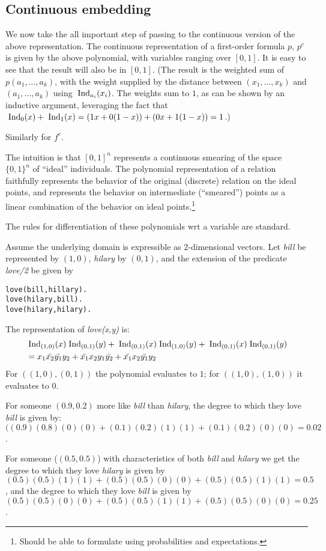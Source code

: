 \documentclass{article} %
\begin{document}
\subsection{Continuous embedding}
We now take the all important step of passing to the continuous version of the above representation. 
The continuous representation of a first-order formula $p$, $p^c$ is given by the above polynomial, with
variables ranging over $[0,1]$. It is easy to see that the result will also be in $[0,1]$. (The result is the weighted sum of $p(a_1, \ldots, 
  a_k)$, with the weight supplied by the distance between $(x_1,
  \ldots, x_k)$ and $(a_1, \ldots, a_k)$ using $\;\mbox{Ind}_{a_i}(x_i)$. The
  weights sum to $1$, as can be shown by an inductive argument,
  leveraging the fact that $\;\mbox{Ind}_{0}(x) + \;\mbox{Ind}_{1}(x)=(1x+0(1-x))+(0x+1(1-x))=1$.)

Similarly for $f^c$. 

The intuition is that $[0,1]^n$ represents a continuous smearing of the space $\{0,1\}^n$ of ``ideal'' individuals. The polynomial representation of a relation faithfully represents the behavior of the original (discrete) relation on the ideal points, and represents the behavior on intermediate (``smeared'') points as a linear combination of the behavior on ideal points.\footnote{Should be able to formulate using probabilities and expectations.}

The rules for differentiation of these polynomials wrt a variable are standard. 

\begin{example}
Assume the underlying domain is expressible as 2-dimensional vectors. Let {\em bill} be represented by $(1, 0)$, {\em hilary} by $(0,1)$, and the extension of the predicate {\em love/2} be given by
\begin{lstlisting}
love(bill,hillary).
love(hilary,bill).
love(hilary,hilary).
\end{lstlisting}
The representation of {\em love(x,y)} is:
\begin{align*}
&\;\mbox{Ind}_{(1,0)}(x)\;\mbox{Ind}_{(0,1)}(y) + \;\mbox{Ind}_{(0,1)}(x)\;\mbox{Ind}_{(1,0)}(y) + \;\mbox{Ind}_{(0,1)}(x)\;\mbox{Ind}_{(0,1)}(y)  \\
&= x_1\bar{x_2}\bar{y_1}y_2 + \bar{x_1}x_2y_1\bar{y_2} + \bar{x_1}x_2\bar{y_1}y_2
\end{align*}
For $((1,0),(0,1))$ the polynomial evaluates to $1$; for 
$((1,0),(1,0))$ it evaluates to $0$. 

For someone $(0.9,0.2)$ more like {\em bill} than {\em hilary}, the degree to which they love
{\em bill} is given by: 
$((0.9)(0.8)(0)(0) + (0.1)(0.2)(1)(1) + (0.1)(0.2)(0)(0)=0.02$.

For someone ($(0.5,0.5)$) with characteristics of both {\em bill} and {\em hilary} we get the degree to which they love {\em hilary}  is given by
$(0.5)(0.5)(1)(1)+(0.5)(0.5)(0)(0)+(0.5)(0.5)(1)(1)=0.5$, and the degree to which they love {\em bill} is given by $(0.5)(0.5)(0)(0) + (0.5)(0.5)(1)(1) + (0.5)(0.5)(0)(0)=0.25$.

\end{example}
\end{document}
